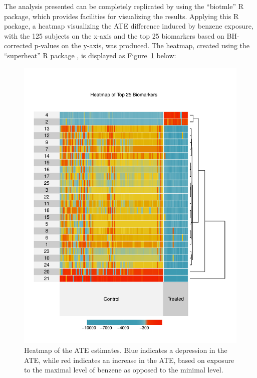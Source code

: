The analysis presented can be completely replicated by using the ``biotmle'' R
package, which provides facilities for visualizing the results. Applying this
R package, a heatmap visualizing the ATE difference induced by benzene exposure,
with the 125 subjects on the x-axis and the top 25 biomarkers based on
BH-corrected p-values on the y-axis, was produced. The heatmap, created using
the ``superheat'' R package \cite{barter2017superheat}, is displayed as
Figure~\ref{fig:heatmap} below:

\begin{figure}[H]
  \vspace{-4em}
  \label{fig:heatmap}
  \centering
  \includegraphics[scale=0.75]{figs/superheatmap.pdf}
  \caption{Heatmap of the ATE estimates. Blue indicates a depression in the
    ATE, while red indicates an increase in the ATE, based on exposure to the
    maximal level of benzene as opposed to the minimal level.}
\end{figure}


